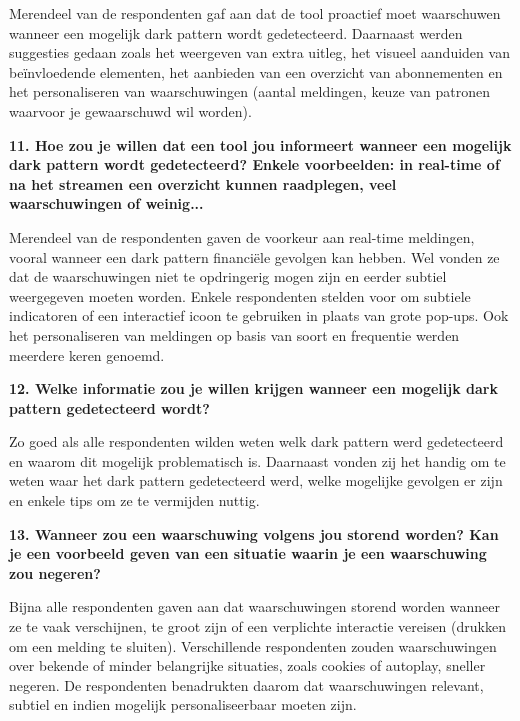 Merendeel van de respondenten gaf aan dat de tool proactief moet waarschuwen wanneer een mogelijk dark pattern wordt gedetecteerd. Daarnaast werden suggesties gedaan zoals het weergeven van extra uitleg, het visueel aanduiden van beïnvloedende elementen, het aanbieden van een overzicht van abonnementen en het personaliseren van waarschuwingen (aantal meldingen, keuze van patronen waarvoor je gewaarschuwd wil worden).

\vspace{1em}

\textbf{11. Hoe zou je willen dat een tool jou informeert wanneer een mogelijk dark pattern wordt gedetecteerd? Enkele voorbeelden: in real-time of na het streamen een overzicht kunnen raadplegen, veel waarschuwingen of weinig...}

Merendeel van de respondenten gaven de voorkeur aan real-time meldingen, vooral wanneer een dark pattern financiële gevolgen kan hebben. Wel vonden ze dat de waarschuwingen niet te opdringerig mogen zijn en eerder subtiel weergegeven moeten worden. Enkele respondenten stelden voor om subtiele indicatoren of een interactief icoon te gebruiken in plaats van grote pop-ups. Ook het personaliseren van meldingen op basis van soort en frequentie werden meerdere keren genoemd.

\vspace{1em}

\textbf{12. Welke informatie zou je willen krijgen wanneer een mogelijk dark pattern gedetecteerd wordt?}

Zo goed als alle respondenten wilden weten welk dark pattern werd gedetecteerd en waarom dit mogelijk problematisch is. Daarnaast vonden zij het handig om te weten waar het dark pattern gedetecteerd werd, welke mogelijke gevolgen er zijn en enkele tips om ze te vermijden nuttig. 

\vspace{1em}

\textbf{13. Wanneer zou een waarschuwing volgens jou storend worden? Kan je een voorbeeld geven van een situatie waarin je een waarschuwing zou negeren?}

Bijna alle respondenten gaven aan dat waarschuwingen storend worden wanneer ze te vaak verschijnen, te groot zijn of een verplichte interactie vereisen (drukken om een melding te sluiten). Verschillende respondenten zouden waarschuwingen over bekende of minder belangrijke situaties, zoals cookies of autoplay, sneller negeren. De respondenten benadrukten daarom dat waarschuwingen relevant, subtiel en indien mogelijk personaliseerbaar moeten zijn.

